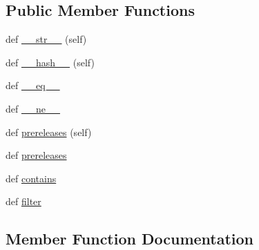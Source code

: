 \subsection*{Public Member Functions}
\begin{DoxyCompactItemize}
\item 
def \hyperlink{classpip_1_1__vendor_1_1packaging_1_1specifiers_1_1BaseSpecifier_a8ebbac846dab480d4535bdc8dac3ba01}{\+\_\+\+\_\+str\+\_\+\+\_\+} (self)
\item 
def \hyperlink{classpip_1_1__vendor_1_1packaging_1_1specifiers_1_1BaseSpecifier_a12bf0c760df61d2a02dfe861e9c62803}{\+\_\+\+\_\+hash\+\_\+\+\_\+} (self)
\item 
def \hyperlink{classpip_1_1__vendor_1_1packaging_1_1specifiers_1_1BaseSpecifier_ac447616cbd9d9ec11c02b0e9e1740dec}{\+\_\+\+\_\+eq\+\_\+\+\_\+}
\item 
def \hyperlink{classpip_1_1__vendor_1_1packaging_1_1specifiers_1_1BaseSpecifier_aa7f15a9fca63926bbc0cab4c3a2c47a7}{\+\_\+\+\_\+ne\+\_\+\+\_\+}
\item 
def \hyperlink{classpip_1_1__vendor_1_1packaging_1_1specifiers_1_1BaseSpecifier_a662154a53e284c4b4af989bf7b2d1894}{prereleases} (self)
\item 
def \hyperlink{classpip_1_1__vendor_1_1packaging_1_1specifiers_1_1BaseSpecifier_aa7131aae1781958bf7e9093864a1651a}{prereleases}
\item 
def \hyperlink{classpip_1_1__vendor_1_1packaging_1_1specifiers_1_1BaseSpecifier_abebeef6fcf091d5acd2a14eefb7d411c}{contains}
\item 
def \hyperlink{classpip_1_1__vendor_1_1packaging_1_1specifiers_1_1BaseSpecifier_afb0ec971b287058a4ff10ac8ed2077b9}{filter}
\end{DoxyCompactItemize}


\subsection{Member Function Documentation}
\mbox{\label{classpip_1_1__vendor_1_1packaging_1_1specifiers_1_1BaseSpecifier_ac447616cbd9d9ec11c02b0e9e1740dec}} 
